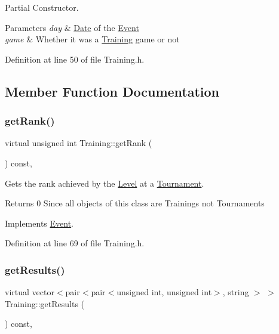 Partial Constructor. 


\begin{DoxyParams}{Parameters}
{\em day} & \hyperlink{class_date}{Date} of the \hyperlink{class_event}{Event} \\
\hline
{\em game} & Whether it was a \hyperlink{class_training}{Training} game or not \\
\hline
\end{DoxyParams}


Definition at line 50 of file Training.\+h.



\subsection{Member Function Documentation}
\hypertarget{class_training_ada723ff1f8340338a99e720a1b472334}{}\label{class_training_ada723ff1f8340338a99e720a1b472334} 
\subsubsection{\texorpdfstring{get\+Rank()}{getRank()}}
{\footnotesize\ttfamily virtual unsigned int Training\+::get\+Rank (\begin{DoxyParamCaption}{ }\end{DoxyParamCaption}) const\hspace{0.3cm}{\ttfamily [inline]}, {\ttfamily [virtual]}}



Gets the rank achieved by the \hyperlink{class_level}{Level} at a \hyperlink{class_tournament}{Tournament}. 

\begin{DoxyReturn}{Returns}
0 Since all objects of this class are Trainings not Tournaments 
\end{DoxyReturn}


Implements \hyperlink{class_event_ab267b8e94c78ca51636792d75101acb5}{Event}.



Definition at line 69 of file Training.\+h.

\hypertarget{class_training_aa37e2baeee2b94cb15521e1768b99cc9}{}\label{class_training_aa37e2baeee2b94cb15521e1768b99cc9} 
\subsubsection{\texorpdfstring{get\+Results()}{getResults()}}
{\footnotesize\ttfamily virtual vector$<$pair$<$pair$<$unsigned int, unsigned int$>$, string $>$ $>$ Training\+::get\+Results (\begin{DoxyParamCaption}{ }\end{DoxyParamCaption}) const\hspace{0.3cm}{\ttfamily [inline]}, {\ttfamily [virtual]}}



